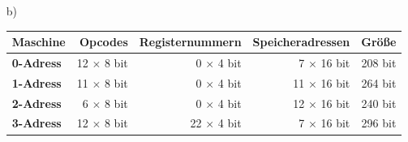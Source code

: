 \documentclass[a4paper,10pt]{scrartcl}
\begin{document}
\begin{enumerate}
\begin{enumerate}
            \item[b)]
                \begin{tabular}[t]{l|r|r|r|r}
                Maschine & Opcodes & Registernummern & Speicheradressen & Größe \\
                \hline
                \textbf{0-Adress} & 12 $\times$ 8 bit & 0  $\times$ 4 bit & 7  $\times$ 16 bit & 208 bit \\
                \textbf{1-Adress} & 11 $\times$ 8 bit & 0  $\times$ 4 bit & 11 $\times$ 16 bit & 264 bit \\
                \textbf{2-Adress} & 6  $\times$ 8 bit & 0  $\times$ 4 bit & 12 $\times$ 16 bit & 240 bit \\
                \textbf{3-Adress} & 12 $\times$ 8 bit & 22 $\times$ 4 bit & 7  $\times$ 16 bit & 296 bit \\
              \end{tabular}

        \end{enumerate}
\end{enumerate}
\end{document}
